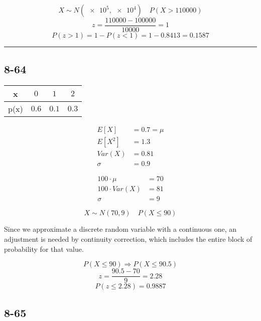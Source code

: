 \documentclass{article}
\newcommand{\qline}{\par\noindent\rule{4.5in}{1pt}}
\begin{document}
			\[
				X \sim N(\num{e5}, \num{e4}) \quad P(X > 110000)
			\]
			\[
				z = \frac{110000 - 100000}{10000} = 1
			\]
			\[
				P(z > 1) = 1 - P(z < 1) = 1 - 0.8413 = \boxed{\num{0.1587}}
			\]

	\qline

		\subsection*{8-64}

			\begin{center}
				\begin{tabular}{c|c|c|c}
					x & $0$ & $1$ & $2$ \\ \hline
					p(x) & $0.6$ & $0.1$ & $0.3$ \\
				\end{tabular}
				\begin{equation*}
					\begin{split}
						E[X] &= 0.7 = \mu \\
						E[X^2] &= 1.3 \\
						Var(X) &= 0.81 \\
						\sigma &= 0.9
					\end{split}
				\end{equation*}
			\end{center}

			\begin{equation*}
				\begin{split}
					100 \cdot \mu &= 70 \\
					100 \cdot Var(X) &= 81 \\
					\sigma &= 9
				\end{split}
			\end{equation*}

			\[
				X \sim N(70, 9) \quad P(X \leq 90)
			\]
			\begin{center}
				Since we approximate a discrete random variable with a continuous one, an adjustment is needed by continuity correction, which includes the entire block of probability for that value.
			\end{center}
			\[
				P(X \leq 90) \Rightarrow  P(X \leq 90.5)
			\]
			\[
				z = \frac{90.5 - 70}{9} = 2.28
			\]
			\[
				P(z \leq 2.28) = \boxed{0.9887}
			\]

	\clearpage

		\subsection*{8-65}
\end{document}
